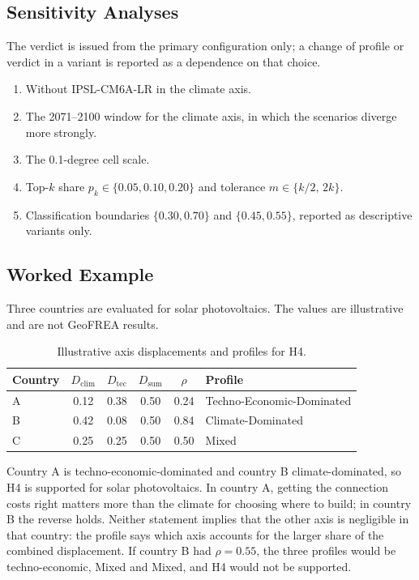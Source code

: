\subsection{Sensitivity Analyses}
\label{subsec:h4_sensitivity}

The verdict is issued from the primary configuration only; a change of profile or
verdict in a variant is reported as a dependence on that choice.
\begin{enumerate}
    \item Without IPSL-CM6A-LR in the climate axis.
    \item The 2071--2100 window for the climate axis, in which the scenarios
    diverge more strongly.
    \item The 0.1-degree cell scale.
    \item Top-$k$ share $p_k\in\{0.05,0.10,0.20\}$ and tolerance
    $m\in\{k/2,\,2k\}$.
    \item Classification boundaries $\{0.30,0.70\}$ and $\{0.45,0.55\}$, reported
    as descriptive variants only.
\end{enumerate}

\subsection{Worked Example}
\label{subsec:h4_example}

Three countries are evaluated for solar photovoltaics. The values are
illustrative and are not GeoFREA results.

\begin{table}[htbp]
    \centering
    \caption{Illustrative axis displacements and profiles for H4.}
    \label{tab:h4_example}
    \small
    \begin{tabular}{lccccl}
        \toprule
        \textbf{Country} & $D_{\mathrm{clim}}$ & $D_{\mathrm{tec}}$ &
        $D_{\mathrm{sum}}$ & $\rho$ & \textbf{Profile} \\
        \midrule
        A & 0.12 & 0.38 & 0.50 & 0.24 & Techno-Economic-Dominated \\
        B & 0.42 & 0.08 & 0.50 & 0.84 & Climate-Dominated \\
        C & 0.25 & 0.25 & 0.50 & 0.50 & Mixed \\
        \bottomrule
    \end{tabular}
\end{table}

Country A is techno-economic-dominated and country B climate-dominated, so H4 is
supported for solar photovoltaics. In country A, getting the connection costs
right matters more than the climate for choosing where to build; in country B
the reverse holds. Neither statement implies that the other axis is negligible
in that country: the profile says which axis accounts for the larger share of
the combined displacement. If country B had $\rho=0.55$, the three profiles
would be techno-economic, Mixed and Mixed, and H4 would not be supported.

